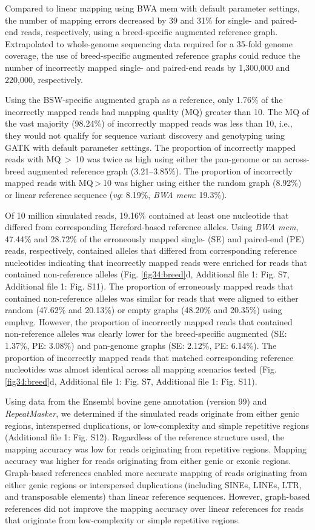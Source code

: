 \documentclass[../main.tex]{subfiles}
\begin{document}
Compared to linear mapping using BWA mem with default parameter settings, the number of mapping errors decreased by 39 and 31\% for single- and paired-end reads, respectively, using a breed-specific augmented reference graph. Extrapolated to whole-genome sequencing data required for a 35-fold genome coverage, the use of breed-specific augmented reference graphs could reduce the number of incorrectly mapped single- and paired-end reads by 1,300,000 and 220,000, respectively.

Using the BSW-specific augmented graph as a reference, only 1.76\% of the incorrectly mapped reads had mapping quality (MQ) greater than 10. The MQ of the vast majority (98.24\%) of incorrectly mapped reads was less than 10, i.e., they would not qualify for sequence variant discovery and genotyping using GATK with default parameter settings. The proportion of incorrectly mapped reads with MQ $>$ 10 was twice as high using either the pan-genome or an across-breed augmented reference graph (3.21–3.85\%). The proportion of incorrectly mapped reads with MQ > 10 was higher using either the random graph (8.92\%) or linear reference sequence (\emph{vg}: 8.19\%, \emph{BWA mem}: 19.3\%).

Of 10 million simulated reads, 19.16\% contained at least one nucleotide that differed from corresponding Hereford-based reference alleles. Using \emph{BWA mem}, 47.44\% and 28.72\% of the erroneously mapped single- (SE) and paired-end (PE) reads, respectively, contained alleles that differed from corresponding reference nucleotides indicating that incorrectly mapped reads were enriched for reads that contained non-reference alleles (Fig. \ref{fig34:breed}d, Additional file 1: Fig. S7, Additional file 1: Fig. S11). The proportion of erroneously mapped reads that contained non-reference alleles was similar for reads that were aligned to either random (47.62\% and 20.13\%) or empty graphs (48.20\% and 20.35\%) using emph{vg}. However, the proportion of incorrectly mapped reads that contained non-reference alleles was clearly lower for the breed-specific augmented (SE: 1.37\%, PE: 3.08\%) and pan-genome graphs (SE: 2.12\%, PE: 6.14\%). The proportion of incorrectly mapped reads that matched corresponding reference nucleotides was almost identical across all mapping scenarios tested (Fig. \ref{fig34:breed}d, Additional file 1: Fig. S7, Additional file 1: Fig. S11).

Using data from the Ensembl bovine gene annotation (version 99) and \emph{RepeatMasker}, we determined if the simulated reads originate from either genic regions, interspersed duplications, or low-complexity and simple repetitive regions (Additional file 1: Fig. S12). Regardless of the reference structure used, the mapping accuracy was low for reads originating from repetitive regions. Mapping accuracy was higher for reads originating from either genic or exonic regions. Graph-based references enabled more accurate mapping of reads originating from either genic regions or interspersed duplications (including SINEs, LINEs, LTR, and transposable elements) than linear reference sequences. However, graph-based references did not improve the mapping accuracy over linear references for reads that originate from low-complexity or simple repetitive regions.
\end{document}

